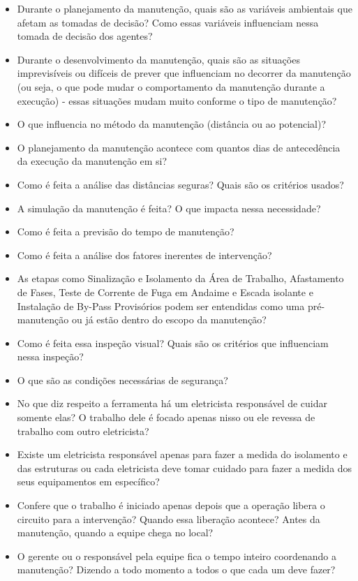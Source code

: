 \begin{itemize}
    \item Durante o planejamento da manutenção, quais são as variáveis ambientais que afetam as tomadas de decisão? Como essas variáveis influenciam nessa tomada de decisão dos agentes?
    \item Durante o desenvolvimento da manutenção, quais são as situações imprevisíveis ou difíceis de prever que influenciam no decorrer da manutenção (ou seja, o que pode mudar o comportamento da manutenção durante a execução) - essas situações mudam muito conforme o tipo de manutenção?
    \item O que influencia no método da manutenção (distância ou ao potencial)?
    \item O planejamento da manutenção acontece com quantos dias de antecedência da execução da manutenção em si?
    \item Como é feita a análise das distâncias seguras? Quais são os critérios usados?
    \item A simulação da manutenção é feita? O que impacta nessa necessidade?  
    \item Como é feita a previsão do tempo de manutenção? 
    \item Como é feita a análise dos fatores inerentes de intervenção?  
    \item As etapas como Sinalização e Isolamento da Área de Trabalho, Afastamento de Fases, Teste de Corrente de Fuga em Andaime e Escada isolante e Instalação de By-Pass Provisórios podem ser entendidas como uma pré-manutenção ou já estão dentro do escopo da manutenção?
    \item Como é feita essa inspeção visual? Quais são os critérios que influenciam nessa inspeção? 
    \item O que são as condições necessárias de segurança? 
    \item No que diz respeito a ferramenta há um eletricista responsável de cuidar somente elas? O trabalho dele é focado apenas nisso ou ele revessa de trabalho com outro eletricista? 
    \item Existe um eletricista responsável apenas para fazer a medida do isolamento e das estruturas ou cada eletricista deve tomar cuidado para fazer a medida dos seus equipamentos em específico?
    \item Confere que o trabalho é iniciado apenas depois que a operação libera o circuito para a intervenção? Quando essa liberação acontece? Antes da manutenção, quando a equipe chega no local?
    \item O gerente ou o responsável pela equipe fica o tempo inteiro coordenando a manutenção? Dizendo a todo momento a todos o que cada um deve fazer? 

\end{itemize}
